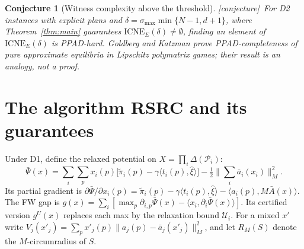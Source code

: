 \documentclass[11pt]{article}
\newtheorem{conjecture}[theorem]{Conjecture}
\theoremstyle{definition}
\theoremstyle{remark}
\newcommand{\cP}{\mathcal{P}}
\newcommand{\abar}{\bar a}
\newcommand{\Abar}{\bar A}
\newcommand{\ICNE}{\mathrm{ICNE}}
\newcommand{\CONJ}{\textsf{[conjecture]}}
\begin{document}
\begin{conjecture}[Witness complexity above the threshold]\label{conj:witness} \CONJ\
For D2 instances with explicit plans and $\delta=\sigma_{\max}\min\{N-1,d+1\}$, where Theorem~\ref{thm:main} guarantees $\ICNE_E(\delta)\neq\emptyset$, finding an element of $\ICNE_E(\delta)$ is PPAD-hard. Goldberg and Katzman \cite{GK23} prove PPAD-completeness of pure approximate equilibria in Lipschitz polymatrix games; their result is an analogy, not a proof.
\end{conjecture}

\section{The algorithm RSRC and its guarantees}\label{sec:algo}

Under D1, define the relaxed potential on $X=\prod_i\Delta(\cP_i)$:
\[\bar\Psi(x)=\sum_i\sum_px_i(p)\big[\tilde\pi_i(p)-\gamma\langle t_i(p),\hat\xi\rangle\big]-\tfrac12\Big\|\sum_i\abar_i(x_i)\Big\|_M^2.\]
Its partial gradient is $\partial\bar\Psi/\partial x_i(p)=\tilde\pi_i(p)-\gamma\langle t_i(p),\hat\xi\rangle-\langle a_i(p),M\Abar(x)\rangle$. The FW gap is $g(x)=\sum_i[\max_p\partial_{i,p}\bar\Psi(x)-\langle x_i,\partial_i\bar\Psi(x)\rangle]$. Its certified version $g^U(x)$ replaces each max by the relaxation bound $\mathcal U_i$. For a mixed $x'$ write $V_j(x'_j)=\sum_px'_j(p)\|a_j(p)-\abar_j(x'_j)\|_M^2$, and let $R_M(S)$ denote the $M$-circumradius of $S$.
\end{document}
